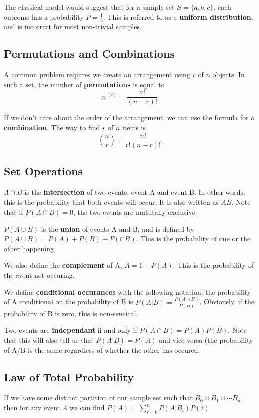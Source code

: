\documentclass[12pt]{article}
\begin{document}
The classical model would suggest that for a sample set $S = \{ a, b, c \}$, each outcome has a probability $P = \frac{1}{3}$. This is referred to as a {\bf uniform distribution}, and is incorrect for most non-trivial samples.

\subsection*{Permutations and Combinations}
A common problem requires we create an arrangement using $r$ of $n$ objects. In such a set, the number of {\bf permutations} is equal to \[ n^{(r)} = \frac{n!}{(n-r)!} \]

If we don't care about the order of the arrangement, we can use the formula for a {\bf combination}. The way to find $r$ of $n$ items is \[ {n \choose r} = \frac{n!}{r!(n-r)!} \]

\subsection*{Set Operations}
$A \cap B$ is the {\bf intersection} of two events, event A and event B. In other words, this is the probability that both events will occur. It is also written as $AB$. Note that if $P(A \cap B) = 0$, the two events are mututally exclusive.

$P(A \cup B)$ is the {\bf union} of events A and B, and is defined by $P(A \cup B) = P(A) + P(B) - P( \cap B)$. This is the probability of one or the other happening.

We also define the {\bf complement} of A, $\overline{A} = 1 - P(A)$. This is the probability of the event not occuring.

We define {\bf conditional occurances} with the following notation: the probability of A conditional on the probability of B is $P(A|B) = \frac{P(A \cap B)}{P(B)}$. Obviously, if the probability of B is zero, this is non-sensical.

Two events are {\bf independant} if and only if $P(A \cap B) = P(A) P(B)$. Note that this will also tell us that $P(A|B) = P(A)$ and vice-versa (the probability of A/B is the same regardless of whether the other has occured.

\subsection*{Law of Total Probability}
If we have some distinct partition of our sample set such that $B_0 \cup B_1 \cup \cdots B_n$, then for any event $A$ we can find $P(A) = \displaystyle\sum_{i=0}^n P(A|B_i)P(i)$
\end{document}
